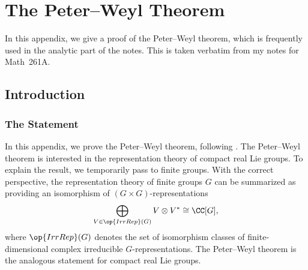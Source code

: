 \documentclass[notes.tex]{subfiles}
\begin{document}
\chapter{The Peter--Weyl Theorem}

In this appendix, we give a proof of the Peter--Weyl theorem, which is frequently used in the analytic part of the notes. This is taken verbatim from my notes for Math~261A.

\section{Introduction}

\subsection{The Statement}
In this appendix, we prove the Peter--Weyl theorem, following \cite[Sections~34--36]{etingof-lie-theory}. The Peter--Weyl theorem is interested in the representation theory of compact real Lie groups. To explain the result, we temporarily pass to finite groups. With the correct perspective, the representation theory of finite groups $G$ can be summarized as providing an isomorphism of $(G\times G)$-representations
\[\bigoplus_{V\in\op{IrrRep}(G)}V\otimes V^*\cong\CC[G],\]
where $\op{IrrRep}(G)$ denotes the set of isomorphism classes of finite-dimensional complex irreducible $G$-rep\-resentations. The Peter--Weyl theorem is the analogous statement for compact real Lie groups.
\end{document}
